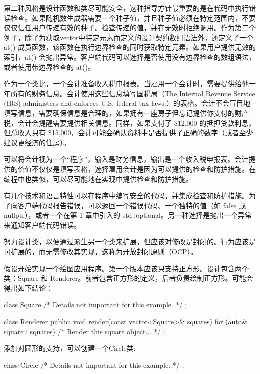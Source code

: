 第二种风格是设计函数和类尽可能安全，这种指导方针最重要的是在代码中执行错误检查。如果随机数生成器需要一个种子值，并且种子值必须在特定范围内，不要仅仅信任用户传递有效的种子。检查传递的值，并在无效时拒绝调用。作为第二个例子，除了为获取vector中特定元素而定义的设计契约数组语法外，还定义了一个 at() 成员函数，该函数在执行边界检查的同时获取特定元素。如果用户提供无效的索引，at() 会抛出异常。客户端代码可以选择是否使用没有边界检查的数组语法，或者使用带边界检查的 at()。

作为一个类比，一个会计准备收入税申报表。当雇用一个会计时，需要提供给他一年所有的财务信息。会计使用这些信息填写国税局（The Internal Revenue Service (IRS) administers and enforces U.S. federal tax laws.）的表格。会计不会盲目地填写信息，需要确保信息是合理的，如果拥有一座房子但忘记提供你支付的财产税，会计会提醒需要提供相关信息。同样，如果支付了 \$12,000 的抵押贷款利息，但总收入只有 \$15,000，会计可能会确认资料中是否提供了正确的数字（或者至少建议更经济的住房）。

可以将会计视为一个“程序”，输入是财务信息，输出是一个收入税申报表。会计提供的价值不仅仅是填写表格，选择雇用会计是因为可以提供的检查和防护措施。在编程中也类似，可以尽可能地在实现中提供检查和防护措施。

有几个技术和语言特性可以在程序中编写安全的代码，并集成检查和防护措施。为了向客户端代码报告错误，可以返回一个错误代码、一个独特的值（如 false 或 nullptr），或者一个在第 1 章中引入的 std::optional。另一种选择是抛出一个异常来通知客户端代码错误。


努力设计类，以便通过派生另一个类来扩展，但应该对修改是封闭的。行为应该是可扩展的，而无需修改其实现，这称为开放封闭原则（OCP）。

假设开始实现一个绘图应用程序。第一个版本应该只支持正方形。设计包含两个类：Square 和 Renderer。前者包含正方形的定义，后者负责绘制正方形。可能会得出如下结论：

\begin{cpp}
class Square { /* Details not important for this example. */ };

class Renderer
{
    public:
    void render(const vector<Square>& squares)
    {
        for (auto& square : squares) { /* Render this square object... */ }
    }
};
\end{cpp}

添加对圆形的支持，可以创建一个Circle类:

\begin{cpp}
class Circle { /* Details not important for this example. */ };
\end{cpp}

